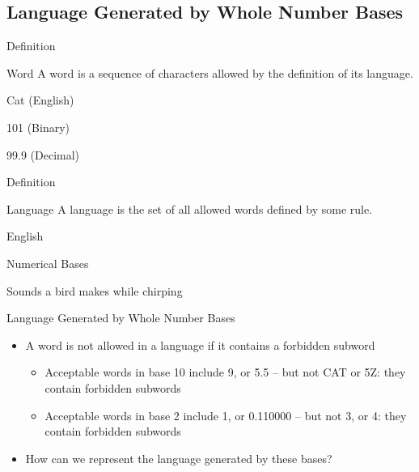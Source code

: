 \documentclass{beamer}
\begin{document}
\subsection{Language Generated by Whole Number Bases}
\begin{frame}{Definition}
  \begin{block}{Word}
    A word is a sequence of characters allowed by the definition of its language.
  \end{block}\pause

  \begin{example} \pause
    Cat (English)\pause

    101 (Binary) \pause

    99.9 (Decimal)
  \end{example}
\end{frame}

\begin{frame}{Definition}
  \begin{block}{Language}
    A language is the set of all allowed words defined by some rule.
  \end{block}\pause

  \begin{example}\pause
    English \pause

    Numerical Bases \pause

    Sounds a bird makes while chirping
  \end{example}
\end{frame}

\begin{frame}{Language Generated by Whole Number Bases}
  \begin{itemize}
    \item A word is not allowed in a language if it contains a forbidden subword \pause
    \begin{itemize}
      \item Acceptable words in base 10 include 9, or 5.5 -- but not CAT or 5Z: they contain forbidden subwords \pause
      \item Acceptable words in base 2 include 1, or 0.110000 -- but not 3, or 4: they contain forbidden subwords
    \end{itemize}\pause
    \item How can we represent the language generated by these bases?
  \end{itemize}
\end{frame}
\end{document}
